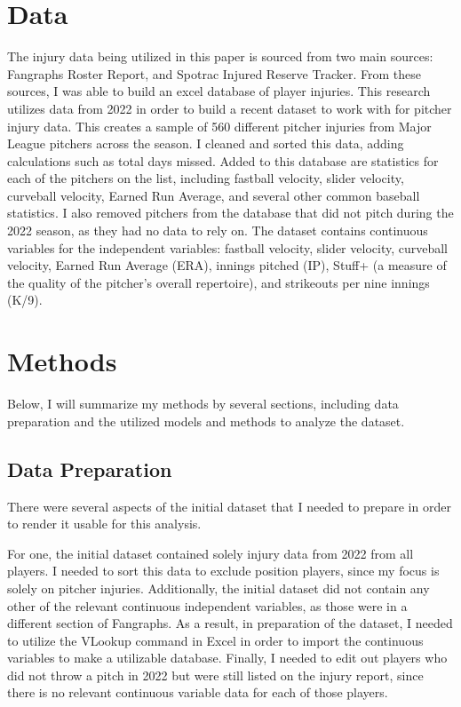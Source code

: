 \documentclass{article}
\begin{document}
\section{Data}
The injury data being utilized in this paper is sourced from two main sources: Fangraphs Roster Report, and Spotrac Injured Reserve Tracker. From these sources, I was able to build an excel database of player injuries. This research utilizes data from 2022 in order to build a recent dataset to work with for pitcher injury data. This creates a sample of 560 different pitcher injuries from Major League pitchers across the season. I cleaned and sorted this data, adding calculations such as total days missed. Added to this database are statistics for each of the pitchers on the list, including fastball velocity, slider velocity, curveball velocity, Earned Run Average, and several other common baseball statistics. I also removed pitchers from the database that did not pitch during the 2022 season, as they had no data to rely on. The dataset contains continuous variables for the independent variables: fastball velocity, slider velocity, curveball velocity, Earned Run Average (ERA), innings pitched (IP), Stuff+ (a measure of the quality of the pitcher's overall repertoire), and strikeouts per nine innings (K/9). 

\section{Methods}

Below, I will summarize my methods by several sections, including data preparation and the utilized models and methods to analyze the dataset.

\subsection{Data Preparation}

There were several aspects of the initial dataset that I needed to prepare in order to render it usable for this analysis. 

For one, the initial dataset contained solely injury data from 2022 from all players. I needed to sort this data to exclude position players, since my focus is solely on pitcher injuries. Additionally, the initial dataset did not contain any other of the relevant continuous independent variables, as those were in a different section of Fangraphs. As a result, in preparation of the dataset, I needed to utilize the VLookup command in Excel in order to import the continuous variables to make a utilizable database. Finally, I needed to edit out players who did not throw a pitch in 2022 but were still listed on the injury report, since there is no relevant continuous variable data for each of those players. 
\end{document}
